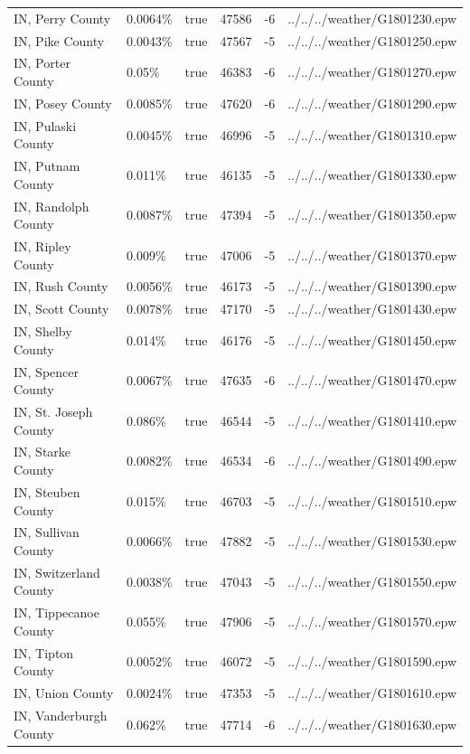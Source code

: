 \begin{longtable}[]{@{}llllll@{}}
IN, Perry County & 0.0064\% & true & 47586 & -6 &
../../../weather/G1801230.epw \\
IN, Pike County & 0.0043\% & true & 47567 & -5 &
../../../weather/G1801250.epw \\
IN, Porter County & 0.05\% & true & 46383 & -6 &
../../../weather/G1801270.epw \\
IN, Posey County & 0.0085\% & true & 47620 & -6 &
../../../weather/G1801290.epw \\
IN, Pulaski County & 0.0045\% & true & 46996 & -5 &
../../../weather/G1801310.epw \\
IN, Putnam County & 0.011\% & true & 46135 & -5 &
../../../weather/G1801330.epw \\
IN, Randolph County & 0.0087\% & true & 47394 & -5 &
../../../weather/G1801350.epw \\
IN, Ripley County & 0.009\% & true & 47006 & -5 &
../../../weather/G1801370.epw \\
IN, Rush County & 0.0056\% & true & 46173 & -5 &
../../../weather/G1801390.epw \\
IN, Scott County & 0.0078\% & true & 47170 & -5 &
../../../weather/G1801430.epw \\
IN, Shelby County & 0.014\% & true & 46176 & -5 &
../../../weather/G1801450.epw \\
IN, Spencer County & 0.0067\% & true & 47635 & -6 &
../../../weather/G1801470.epw \\
IN, St. Joseph County & 0.086\% & true & 46544 & -5 &
../../../weather/G1801410.epw \\
IN, Starke County & 0.0082\% & true & 46534 & -6 &
../../../weather/G1801490.epw \\
IN, Steuben County & 0.015\% & true & 46703 & -5 &
../../../weather/G1801510.epw \\
IN, Sullivan County & 0.0066\% & true & 47882 & -5 &
../../../weather/G1801530.epw \\
IN, Switzerland County & 0.0038\% & true & 47043 & -5 &
../../../weather/G1801550.epw \\
IN, Tippecanoe County & 0.055\% & true & 47906 & -5 &
../../../weather/G1801570.epw \\
IN, Tipton County & 0.0052\% & true & 46072 & -5 &
../../../weather/G1801590.epw \\
IN, Union County & 0.0024\% & true & 47353 & -5 &
../../../weather/G1801610.epw \\
IN, Vanderburgh County & 0.062\% & true & 47714 & -6 &
../../../weather/G1801630.epw \\

\end{longtable}
